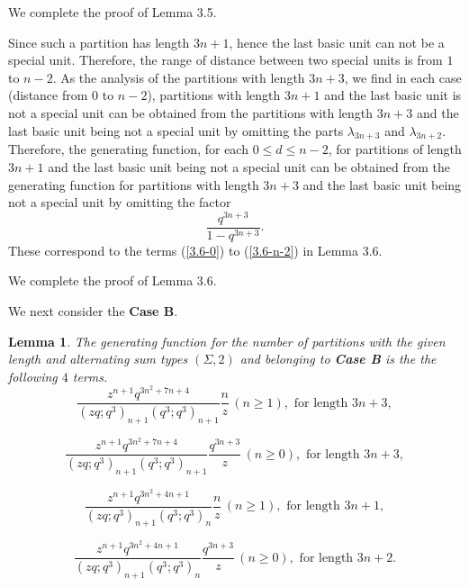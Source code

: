 \documentclass[draft]{amsart}
\numberwithin{equation}{section}
\theoremstyle{plain}
\newtheorem{lemma}[theorem]{Lemma}
\theoremstyle{remark}
\begin{document}
We complete the proof of Lemma 3.5.





Since such a partition has length $3n+1$,  hence the last basic unit can not be a special unit. Therefore, the range of distance 
between two special units is from $1$ to $n-2$. As the analysis of the partitions with length $3n+3$, we find in each case
(distance from $0$ to $n-2$), partitions with length $3n+1$ and the last basic unit is not a special unit can be obtained from
the partitions with length $3n+3$ and the last basic unit being not a special unit by omitting the parts $\lambda_{3n+3}$ and $\lambda_{3n+2}$. Therefore, the generating function, for each $0\leq d\leq n-2$,  for partitions of length $3n+1$ and  the last basic unit being not a special unit can be obtained from the generating function for partitions with length $3n+3$ and the last basic unit being not a special unit by omitting the factor $$\frac{q^{3n+3}}{1-q^{3n+3}}.$$ These correspond to the terms 
(\ref{3.6-0}) to (\ref{3.6-n-2}) in Lemma 3.6.

We complete the proof of Lemma 3.6.

We next consider the {\textbf{Case B}.}

\begin{lemma}\label{Lemma 3.7}%
 The generating function for the number of partitions with the given length and alternating sum types $(\Sigma,2)$ and belonging to \textbf{Case B} is the the following $4$ terms.
\begin{equation}\tag{1}\label{3.7-1}
\frac{z^{n+1}q^{3n^{2}+7n+4}}{(zq;q^{3})_{n+1}(q^{3};q^{3})_{n+1}}\frac{n}{z} \, (n\geq 1), \mbox{ for length  } 3n+3,
\end{equation}


\begin{equation}\tag{2}\label{3.7-2}
\frac{z^{n+1}q^{3n^{2}+7n+4}}{(zq;q^{3})_{n+1}(q^{3};q^{3})_{n+1}}\frac{q^{3n+3}}{z}\, (n\geq 0), \mbox { for length } 3n+3,
\end{equation}

\begin{equation}\tag{3}\label{3.7-3}
\frac{z^{n+1}q^{3n^{2}+4n+1}}{(zq;q^{3})_{n+1}(q^{3};q^{3})_{n}} \frac{n}{z} \, (n\geq 1), \mbox{ for length } 3n+1,
\end{equation}


\begin{equation}\tag{4}\label{3.7-4}
\frac{z^{n+1}q^{3n^{2}+4n+1}}{(zq;q^{3})_{n+1}(q^{3};q^{3})_{n}}\frac{q^{3n+3}}{z}  \,(n\geq 0), \mbox{ for length } 3n+2.
\end{equation}
\end{lemma}
\end{document}
